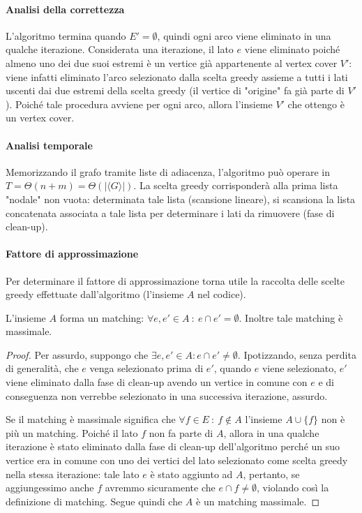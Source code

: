 \paragraph*{Analisi della correttezza}
L'algoritmo termina quando $E'=\emptyset$, quindi ogni arco viene eliminato in una qualche iterazione. Considerata una iterazione, il lato $e$ viene eliminato poiché almeno uno dei due suoi estremi è un vertice già appartenente al vertex cover $V'$: viene infatti eliminato l'arco selezionato dalla scelta greedy assieme a tutti i lati uscenti dai due estremi della scelta greedy (il vertice di "origine" fa già parte di $V'$). Poiché tale procedura avviene per ogni arco, allora l'insieme $V'$ che ottengo è un vertex cover.

\paragraph*{Analisi temporale}
Memorizzando il grafo tramite liste di adiacenza, l'algoritmo può operare in $T=\Theta(n+m)=\Theta(|\langle G\rangle |)$. La scelta greedy corrisponderà alla prima lista "nodale" non vuota: determinata tale lista (scansione lineare), si scansiona la lista concatenata associata a tale lista per determinare i lati da rimuovere (fase di clean-up).

\paragraph*{Fattore di approssimazione}
Per determinare il fattore di approssimazione torna utile la raccolta delle scelte greedy effettuate dall'algoritmo (l'insieme $A$ nel codice).

\begin{proposizione}
L'insieme $A$ forma un matching: $\forall e,e'\in A\ :\ e \cap e' = \emptyset$. Inoltre tale matching è massimale.
\end{proposizione}
\begin{proof}
Per assurdo, suppongo che $\exists e,e'\in A : e \cap e' \neq \emptyset$. Ipotizzando, senza perdita di generalità, che $e$ venga selezionato prima di $e'$, quando $e$ viene selezionato, $e'$ viene eliminato dalla fase di clean-up avendo un vertice in comune con $e$ e di conseguenza non verrebbe selezionato in una successiva iterazione, assurdo.

Se il matching è massimale significa che $\forall f\in E\ :\ f\notin A$ l'insieme $A\cup \{ f\}$ non è più un matching. Poiché il lato $f$ non fa parte di $A$, allora in una qualche iterazione è stato eliminato dalla fase di clean-up dell'algoritmo perché un suo vertice era in comune con uno dei vertici del lato selezionato come scelta greedy nella stessa iterazione: tale lato $e$ è stato aggiunto ad $A$, pertanto, se aggiungessimo anche $f$ avremmo sicuramente che $e\cap f\neq\emptyset$, violando così la definizione di matching. Segue quindi che $A$ è un matching massimale.
\end{proof}

